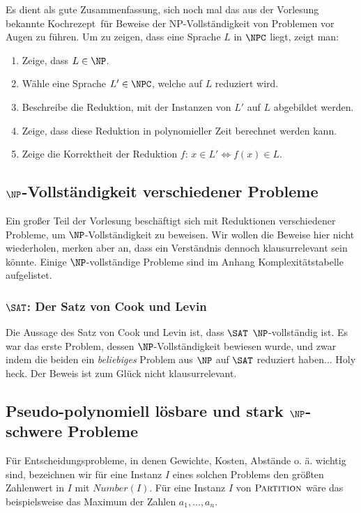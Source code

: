 \documentclass[a4paper,parskip=half*,DIV=7,fontsize=11pt]{scrartcl}
\begin{document}
Es dient als gute Zusammenfassung, sich noch mal das aus der Vorlesung bekannte \glqq Kochrezept\grqq\ für Beweise der NP-Vollständigkeit von Problemen vor Augen zu führen. Um zu zeigen, dass eine Sprache $L$ in $\NPC$ liegt, zeigt man:

\begin{enumerate}
\item Zeige, dass $L \in \NP$.
\item Wähle eine Sprache $L' \in \NPC$, welche auf $L$ reduziert wird.
\item Beschreibe die Reduktion, mit der Instanzen von $L'$ auf $L$ abgebildet werden.
\item Zeige, dass diese Reduktion in polynomieller Zeit berechnet werden kann.
\item Zeige die Korrektheit der Reduktion $f$: $x \in L' \iff f(x) \in L$.
\end{enumerate}

\subsection[NP-Vollständigkeit verschiedener Probleme]{$\NP$-Vollständigkeit verschiedener Probleme}

Ein großer Teil der Vorlesung beschäftigt sich mit Reduktionen verschiedener Probleme, um $\NP$-Vollständigkeit zu beweisen. Wir wollen die Beweise hier nicht wiederholen, merken aber an, dass ein Verständnis dennoch klausurrelevant sein könnte. Einige $\NP$-vollständige Probleme sind im Anhang Komplexitätstabelle aufgelistet.

\subsubsection[SAT: Der Satz von Cook und Levin]{$\SAT$: Der Satz von Cook und Levin}
Die Aussage des Satz von Cook und Levin ist, dass $\SAT$ $\NP$-vollständig ist. Es war das erste Problem, dessen $\NP$-Vollständigkeit bewiesen wurde, und zwar indem die beiden ein \textit{beliebiges} Problem aus $\NP$ auf $\SAT$ reduziert haben... Holy heck. Der Beweis ist zum Glück nicht klausurrelevant.

\subsection{Pseudo-polynomiell lösbare und stark $\NP$-schwere Probleme}
Für Entscheidungsprobleme, in denen Gewichte, Kosten, Abstände o. ä. wichtig sind, bezeichnen wir für eine Instanz $I$ eines solchen Problems den größten Zahlenwert in $I$ mit $Number(I)$. Für eine Instanz $I$ von $\textsc{Partition}$ wäre das beispielsweise das Maximum der Zahlen $a_1,\dots,a_n$.
\end{document}
